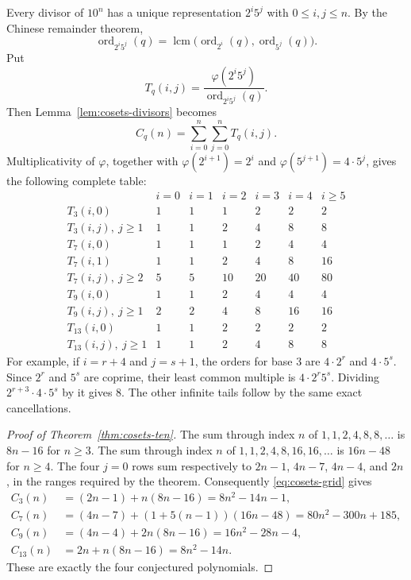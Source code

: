 Every divisor of $10^n$ has a unique representation $2^i5^j$ with
$0\le i,j\le n$. By the Chinese remainder theorem,
\[
 \operatorname{ord}_{2^i5^j}(q)
 =\operatorname{lcm}\bigl(\operatorname{ord}_{2^i}(q),
                         \operatorname{ord}_{5^j}(q)\bigr).
\]
Put
\[
 T_q(i,j)=\frac{\varphi(2^i5^j)}{\operatorname{ord}_{2^i5^j}(q)}.
\]
Then Lemma~\ref{lem:cosets-divisors} becomes
\begin{equation}\label{eq:cosets-grid}
 C_q(n)=\sum_{i=0}^n\sum_{j=0}^n T_q(i,j).
\end{equation}
Multiplicativity of $\varphi$, together with
$\varphi(2^{i+1})=2^i$ and $\varphi(5^{j+1})=4\cdot5^j$,
gives the following complete table:
\[
\begin{array}{c|rrrrrr}
 &i=0&i=1&i=2&i=3&i=4&i\ge5\\\hline
T_3(i,0)&1&1&1&2&2&2\\
T_3(i,j),\ j\ge1&1&1&2&4&8&8\\
T_7(i,0)&1&1&1&2&4&4\\
T_7(i,1)&1&1&2&4&8&16\\
T_7(i,j),\ j\ge2&5&5&10&20&40&80\\
T_9(i,0)&1&1&2&4&4&4\\
T_9(i,j),\ j\ge1&2&2&4&8&16&16\\
T_{13}(i,0)&1&1&2&2&2&2\\
T_{13}(i,j),\ j\ge1&1&1&2&4&8&8
\end{array}
\]
For example, if $i=r+4$ and $j=s+1$, the orders for base $3$ are
$4\cdot2^r$ and $4\cdot5^s$. Since $2^r$ and $5^s$ are coprime,
their least common multiple is $4\cdot2^r5^s$. Dividing
$2^{r+3}\cdot4\cdot5^s$ by it gives $8$. The other infinite
tails follow by the same exact cancellations.

\begin{proof}[Proof of Theorem~\ref{thm:cosets-ten}]
The sum through index $n$ of $1,1,2,4,8,8,\ldots$ is
$8n-16$ for $n\ge3$. The sum through index $n$ of
$1,1,2,4,8,16,16,\ldots$ is $16n-48$ for $n\ge4$.
The four $j=0$ rows sum respectively to $2n-1$, $4n-7$,
$4n-4$, and $2n$, in the ranges required by the theorem.
Consequently \eqref{eq:cosets-grid} gives
\begin{align*}
 C_3(n)&=(2n-1)+n(8n-16)=8n^2-14n-1,\\
 C_7(n)&=(4n-7)+(1+5(n-1))(16n-48)
        =80n^2-300n+185,\\
 C_9(n)&=(4n-4)+2n(8n-16)=16n^2-28n-4,\\
 C_{13}(n)&=2n+n(8n-16)=8n^2-14n.
\end{align*}
These are exactly the four conjectured polynomials.
\end{proof}

